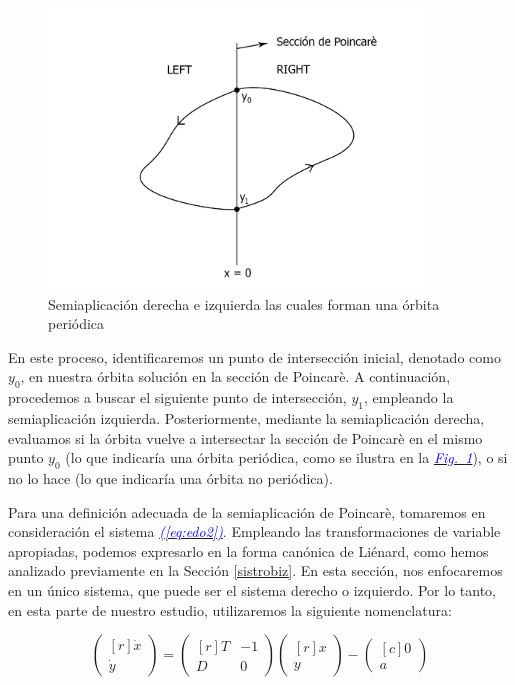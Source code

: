 \documentclass[12pt,a4paper]{report} %
\newcommand{\fref}[1]{\hyperref[#1]{\textcolor{blue}{\textit{Fig.~\ref*{#1}}}}}
\newcommand{\eref}[1]{\hyperref[#1]{\textcolor{blue}{\textit{(\ref*{#1})}}}}
\begin{document}
	\begin{figure}[h]
		\centering
		\includegraphics[width=0.9\textwidth]{poincaLR.jpg}
		\caption{Semiaplicación derecha e izquierda las cuales forman una órbita periódica}
		\label{fig:poincaLR}
	\end{figure}\smallskip
	
	En este proceso, identificaremos un punto de intersección inicial, denotado como $y_0$, en nuestra órbita solución en la sección de Poincarè. A continuación, procedemos a buscar el siguiente punto de intersección, $y_1$, empleando la semiaplicación izquierda. Posteriormente, mediante la semiaplicación derecha, evaluamos si la órbita vuelve a intersectar la sección de Poincarè en el mismo punto $y_0$ (lo que indicaría una órbita periódica, como se ilustra en la \fref{fig:poincaLR}), o si no lo hace (lo que indicaría una órbita no periódica).
	
	\vspace{0.5cm}Para una definición adecuada de la semiaplicación de Poincarè, tomaremos en consideración el sistema \eref{eq:edo2}. Empleando las transformaciones de variable apropiadas, podemos expresarlo en la forma canónica de Liénard, como hemos analizado previamente en la Sección \ref{sistrobiz}. En esta sección, nos enfocaremos en un único sistema, que puede ser el sistema derecho o izquierdo. Por lo tanto, en esta parte de nuestro estudio, utilizaremos la siguiente nomenclatura:
	
		\begin{equation}
		\label{eq:lienardsolo}
		\begin{pmatrix*}[r]
			\dot{x}\\ \dot{y}
		\end{pmatrix*}= \begin{pmatrix*}[r]
			T & -1 \\ D & 0
		\end{pmatrix*} \begin{pmatrix*}[r]
			x \\ y
		\end{pmatrix*}-\begin{pmatrix*}[c]
			0 \\ a
		\end{pmatrix*}
	\end{equation}\smallskip
	\newpage
	
\end{document}
